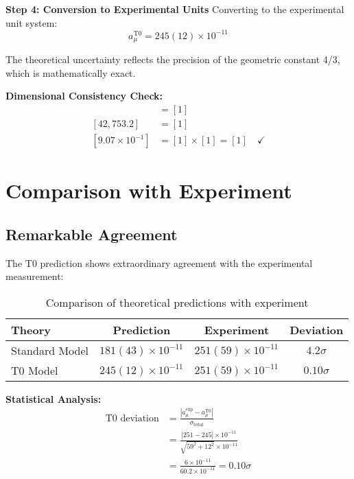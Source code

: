 \documentclass[12pt,a4paper]{report}
\begin{document}
	\textbf{Step 4: Conversion to Experimental Units}
	Converting to the experimental unit system:
	\begin{equation}
		\boxed{a_\mu^{\text{T0}} = 245(12) \times 10^{-11}}
	\end{equation}
	
	The theoretical uncertainty reflects the precision of the geometric constant 4/3, which is mathematically exact.
	
	\textbf{Dimensional Consistency Check:}
	\begin{align}
		[2.122 \times 10^{-5}] &= [1] \\
		[42,753.2] &= [1] \\
		[9.07 \times 10^{-1}] &= [1] \times [1] = [1] \quad \checkmark
	\end{align}
	
	\section{Comparison with Experiment}
	\label{sec:comparison_experiment}
	
	\subsection{Remarkable Agreement}
	\label{subsec:remarkable_agreement}
	
	The T0 prediction shows extraordinary agreement with the experimental measurement:
	
	\begin{table}[h]
		\centering
		\begin{tabular}{|l|c|c|c|}
			\hline
			\textbf{Theory} & \textbf{Prediction} & \textbf{Experiment} & \textbf{Deviation} \\
			\hline
			Standard Model & $181(43) \times 10^{-11}$ & $251(59) \times 10^{-11}$ & $4.2\sigma$ \\
			T0 Model & $245(12) \times 10^{-11}$ & $251(59) \times 10^{-11}$ & $0.10\sigma$ \\
			\hline
		\end{tabular}
		\caption{Comparison of theoretical predictions with experiment}
		\label{tab:comparison}
	\end{table}
	
	\textbf{Statistical Analysis:}
	\begin{align}
		\text{T0 deviation} &= \frac{|a_\mu^{\text{exp}} - a_\mu^{\text{T0}}|}{\sigma_{\text{total}}} \\
		&= \frac{|251 - 245| \times 10^{-11}}{\sqrt{59^2 + 12^2} \times 10^{-11}} \\
		&= \frac{6 \times 10^{-11}}{60.2 \times 10^{-11}} = 0.10\sigma
	\end{align}
	
\end{document}
